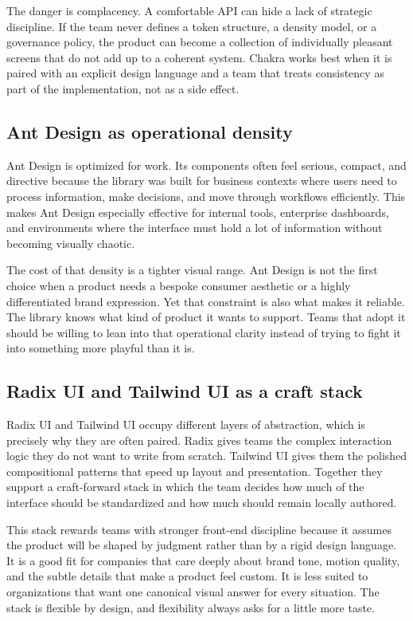 \documentclass[11pt,twoside,a4paper]{article}
\begin{document}
The danger is complacency. A comfortable API can hide a lack of strategic discipline. If the team never defines a token structure, a density model, or a governance policy, the product can become a collection of individually pleasant screens that do not add up to a coherent system. Chakra works best when it is paired with an explicit design language and a team that treats consistency as part of the implementation, not as a side effect.

\subsection{Ant Design as operational density}
Ant Design is optimized for work. Its components often feel serious, compact, and directive because the library was built for business contexts where users need to process information, make decisions, and move through workflows efficiently. This makes Ant Design especially effective for internal tools, enterprise dashboards, and environments where the interface must hold a lot of information without becoming visually chaotic.

The cost of that density is a tighter visual range. Ant Design is not the first choice when a product needs a bespoke consumer aesthetic or a highly differentiated brand expression. Yet that constraint is also what makes it reliable. The library knows what kind of product it wants to support. Teams that adopt it should be willing to lean into that operational clarity instead of trying to fight it into something more playful than it is.

\subsection{Radix UI and Tailwind UI as a craft stack}
Radix UI and Tailwind UI occupy different layers of abstraction, which is precisely why they are often paired. Radix gives teams the complex interaction logic they do not want to write from scratch. Tailwind UI gives them the polished compositional patterns that speed up layout and presentation. Together they support a craft-forward stack in which the team decides how much of the interface should be standardized and how much should remain locally authored.

This stack rewards teams with stronger front-end discipline because it assumes the product will be shaped by judgment rather than by a rigid design language. It is a good fit for companies that care deeply about brand tone, motion quality, and the subtle details that make a product feel custom. It is less suited to organizations that want one canonical visual answer for every situation. The stack is flexible by design, and flexibility always asks for a little more taste.
\end{document}
